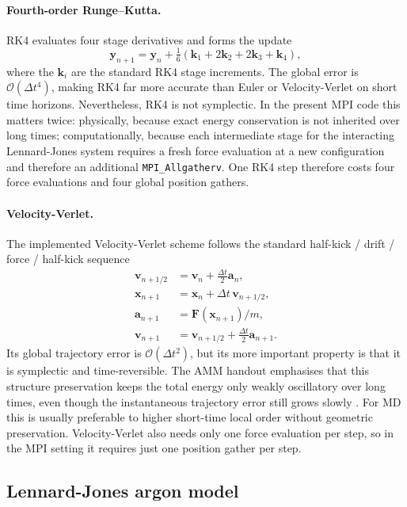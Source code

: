 \documentclass[10pt,twocolumn]{article}
\newcommand{\code}[1]{\texttt{#1}}
\begin{document}
\paragraph{Fourth-order Runge--Kutta.}
RK4 evaluates four stage derivatives and forms the update
\begin{equation}
\mathbf{y}_{n+1} = \mathbf{y}_n + \tfrac16(\mathbf{k}_1+2\mathbf{k}_2+2\mathbf{k}_3+\mathbf{k}_4),
\end{equation}
where the $\mathbf{k}_i$ are the standard RK4 stage increments. The global error is $\mathcal{O}(\Delta t^4)$, making RK4 far more accurate than Euler or Velocity-Verlet on short time horizons. Nevertheless, RK4 is not symplectic. In the present MPI code this matters twice: physically, because exact energy conservation is not inherited over long times; computationally, because each intermediate stage for the interacting Lennard-Jones system requires a fresh force evaluation at a new configuration and therefore an additional \code{MPI\_Allgatherv}. One RK4 step therefore costs four force evaluations and four global position gathers.

\paragraph{Velocity-Verlet.}
The implemented Velocity-Verlet scheme follows the standard half-kick / drift / force / half-kick sequence
\begin{align}
\mathbf{v}_{n+1/2} &= \mathbf{v}_n + \tfrac{\Delta t}{2}\mathbf{a}_n, \\
\mathbf{x}_{n+1} &= \mathbf{x}_n + \Delta t\,\mathbf{v}_{n+1/2}, \\
\mathbf{a}_{n+1} &= \mathbf{F}(\mathbf{x}_{n+1})/m, \\
\mathbf{v}_{n+1} &= \mathbf{v}_{n+1/2} + \tfrac{\Delta t}{2}\mathbf{a}_{n+1}.
\end{align}
Its global trajectory error is $\mathcal{O}(\Delta t^2)$, but its more important property is that it is symplectic and time-reversible. The AMM handout emphasises that this structure preservation keeps the total energy only weakly oscillatory over long times, even though the instantaneous trajectory error still grows slowly \citep{Hairer2006,Swope1982,Verlet1967}. For MD this is usually preferable to higher short-time local order without geometric preservation. Velocity-Verlet also needs only one force evaluation per step, so in the MPI setting it requires just one position gather per step.

\subsection{Lennard-Jones argon model}
\end{document}
